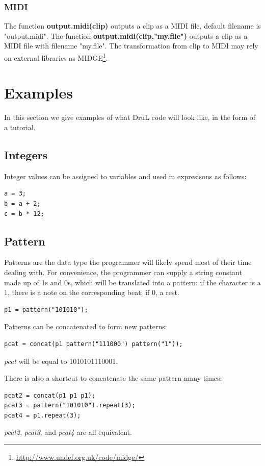 \documentclass[11pt,twoside]{article}
\begin{document}
\subsubsection{MIDI}
The function \textbf{output.midi(clip)} outputs a clip as a MIDI file,
default filename is "output.midi". 
The function \textbf{output.midi(clip,"my.file")} outputs a clip as a MIDI
file with filename "my.file". The transformation from clip to MIDI may rely
on external libraries as MIDGE\footnote{\url{http://www.undef.org.uk/code/midge/}}.


\section{Examples}
In this section we give examples of what DruL code will look like, in the form
of a tutorial.

\subsection{Integers}

Integer values can be assigned to variables and used in expresisons as follows:

\begin{verbatim}
a = 3;
b = a + 2;
c = b * 12;
\end{verbatim}

\subsection{Pattern}
Patterns are the data type the programmer will likely spend most of their time dealing with.  For convenience, the programmer can supply a string constant made up of 1s and 0s, which will be translated into a pattern: if the character is a 1, there is a note on the corresponding beat; if 0, a rest.
\begin{verbatim}
p1 = pattern("101010");
\end{verbatim}
Patterns can be concatenated to form new patterns:
\begin{verbatim}
pcat = concat(p1 pattern("111000") pattern("1"));
\end{verbatim}
\textit{pcat} will be equal to 1010101110001.

There is also a shortcut to concatenate the same pattern many times:
\begin{verbatim}
pcat2 = concat(p1 p1 p1);
pcat3 = pattern("101010").repeat(3);
pcat4 = p1.repeat(3);
\end{verbatim}
\textit{pcat2}, \textit{pcat3}, and \textit{pcat4} are all equivalent.
\end{document}
